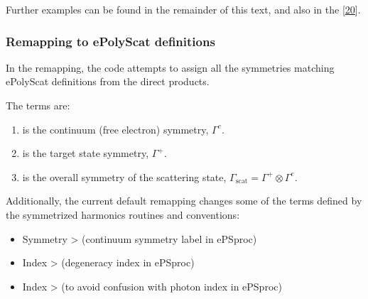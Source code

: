 \documentclass[letterpaper,table,10pt,english]{jupyterBook}
\begin{document}
\sphinxAtStartPar
Further examples can be found in the remainder of this text, and also in the  {[}\hyperlink{cite.backmatter/bibliography:id680}{20}{]}.


\subsubsection{Remapping to ePolyScat definitions}
\label{\detokenize{part2/sym-fitting-intro_240723:remapping-to-epolyscat-definitions}}\label{\detokenize{part2/sym-fitting-intro_240723:sec-basis-sets-remapping-to-eps}}
\sphinxAtStartPar
In the remapping, the code attempts to assign all the symmetries matching ePolyScat definitions from the direct products.

\sphinxAtStartPar
The terms are:
\begin{enumerate}
%
\item {} 
\sphinxAtStartPar
{} is the continuum (free electron) symmetry, \(\Gamma^{e}\).

\item {} 
\sphinxAtStartPar
{} is the target state symmetry, \(\Gamma^{+}\).

\item {} 
\sphinxAtStartPar
{} is the overall symmetry of the scattering state, \(\Gamma_{\mathrm{scat}}=\Gamma^{+}\otimes\Gamma^{e}\).

\end{enumerate}

\sphinxAtStartPar
Additionally, the current default remapping changes some of the terms defined by the symmetrized harmonics routines and conventions:
\begin{itemize}
\item {} 
\sphinxAtStartPar
Symmetry  >  (continuum symmetry label in ePSproc)

\item {} 
\sphinxAtStartPar
Index  >  (degeneracy index in ePSproc)

\item {} 
\sphinxAtStartPar
Index  >  (to avoid confusion with photon index  in ePSproc)

\end{itemize}
\end{document}
